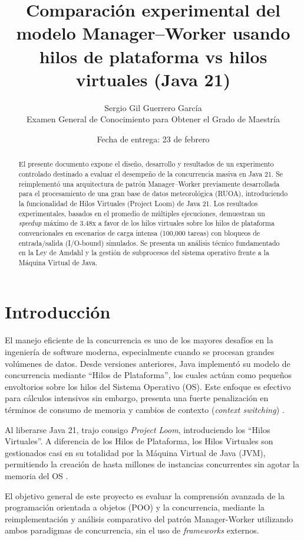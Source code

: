 \documentclass[12pt,a4paper]{article}
\title{\textbf{Comparación experimental del modelo Manager--Worker usando hilos de plataforma vs hilos virtuales (Java 21)}}
\author{Sergio Gil Guerrero García \\ Examen General de Conocimiento para Obtener el Grado de Maestría}
\date{Fecha de entrega: 23 de febrero}
\begin{document}
\maketitle

\begin{abstract}
El presente documento expone el diseño, desarrollo y resultados de un experimento controlado destinado a evaluar el desempeño de la concurrencia masiva en Java 21. Se reimplementó una arquitectura de patrón Manager--Worker previamente desarrollada para el procesamiento de una gran base de datos meteorológica (RUOA), introduciendo la funcionalidad de Hilos Virtuales (Project Loom) de Java 21. Los resultados experimentales, basados en el promedio de múltiples ejecuciones, demuestran un \textit{speedup} máximo de 3.48x a favor de los hilos virtuales sobre los hilos de plataforma convencionales en escenarios de carga intensa (100,000 tareas) con bloqueos de entrada/salida (I/O-bound) simulados. Se presenta un análisis técnico fundamentado en la Ley de Amdahl y la gestión de subprocesos del sistema operativo frente a la Máquina Virtual de Java.
\end{abstract}

\newpage

\section{Introducción}
El manejo eficiente de la concurrencia es uno de los mayores desafíos en la ingeniería de software moderna, especialmente cuando se procesan grandes volúmenes de datos. Desde versiones anteriores, Java implementó su modelo de concurrencia mediante ``Hilos de Plataforma'', los cuales actúan como pequeños envoltorios sobre los hilos del Sistema Operativo (OS). Este enfoque es efectivo para cálculos intensivos sin embargo, presenta una fuerte penalización en términos de consumo de memoria y cambios de contexto (\textit{context switching}) \cite{jep444}. 

Al liberarse Java 21, trajo consigo \textit{Project Loom}, introduciendo los ``Hilos Virtuales''. A diferencia de los Hilos de Plataforma, los Hilos Virtuales son gestionados casi en su totalidad por la Máquina Virtual de Java (JVM), permitiendo la creación de hasta millones de instancias concurrentes sin agotar la memoria del OS \cite{jep444}. 

El objetivo general de este proyecto es evaluar la comprensión avanzada de la programación orientada a objetos (POO) y la concurrencia, mediante la reimplementación y análisis comparativo del patrón Manager-Worker utilizando ambos paradigmas de concurrencia, sin el uso de \textit{frameworks} externos.
\end{document}
